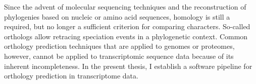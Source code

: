 Since the advent of molecular sequencing techniques and the reconstruction of
phylogenies based on nucleic or amino acid sequences, homology is still a
required, but no longer a sufficient criterion for comparing characters.
So-called orthologs allow retracing speciation events in a phylogenetic context.
Common orthology prediction techniques that are applied to genomes or proteomes,
however, cannot be applied to transcriptomic sequence data because of its
inherent incompleteness. In the present thesis, I establish a software pipeline
for orthology prediction in transcriptome data.


